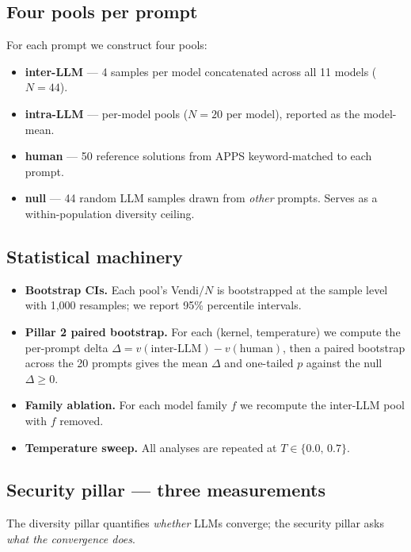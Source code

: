 \documentclass{article}
\begin{document}
\subsection{Four pools per prompt}

For each prompt we construct four pools:

\begin{itemize}[leftmargin=*]
  \item \textbf{inter-LLM} --- 4 samples per model concatenated across all 11
    models ($N=44$).
  \item \textbf{intra-LLM} --- per-model pools ($N=20$ per model), reported as
    the model-mean.
  \item \textbf{human} --- 50 reference solutions from APPS
    \citep{hendrycks2021apps} keyword-matched to each prompt.
  \item \textbf{null} --- 44 random LLM samples drawn from \emph{other}
    prompts. Serves as a within-population diversity ceiling.
\end{itemize}

\subsection{Statistical machinery}

\begin{itemize}[leftmargin=*]
  \item \textbf{Bootstrap CIs.} Each pool's Vendi$/N$ is bootstrapped at the
    sample level with 1{,}000 resamples; we report 95\% percentile intervals.
  \item \textbf{Pillar 2 paired bootstrap.} For each (kernel, temperature) we
    compute the per-prompt delta $\Delta = v(\text{inter-LLM}) - v(\text{human})$,
    then a paired bootstrap across the 20 prompts gives the mean $\Delta$ and
    one-tailed $p$ against the null $\Delta\ge 0$.
  \item \textbf{Family ablation.} For each model family $f$ we recompute the
    inter-LLM pool with $f$ removed.
  \item \textbf{Temperature sweep.} All analyses are repeated at
    $T\in\{0.0,\,0.7\}$.
\end{itemize}

\subsection{Security pillar --- three measurements}

The diversity pillar quantifies \emph{whether} LLMs converge; the security
pillar asks \emph{what the convergence does}.
\end{document}
